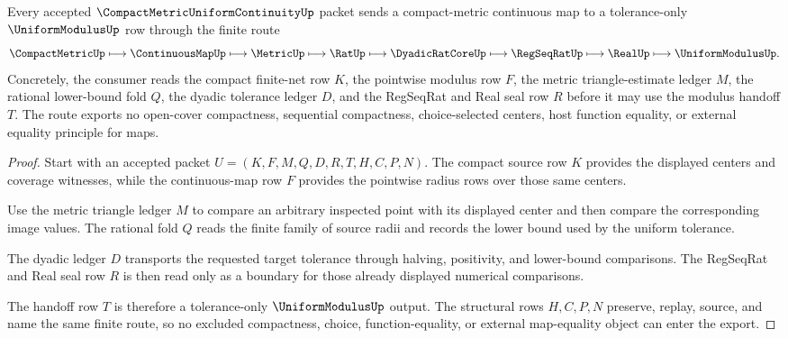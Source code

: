 \begin{theorem}
\label{thm:compact-metric-uniform-continuity-finite-net-modulus-route}
Every accepted $\CompactMetricUniformContinuityUp$ packet sends a compact-metric continuous map to a tolerance-only $\UniformModulusUp$ row through the finite route
$$
\CompactMetricUp
\longmapsto
\ContinuousMapUp
\longmapsto
\MetricUp
\longmapsto
\RatUp
\longmapsto
\DyadicRatCoreUp
\longmapsto
\RegSeqRatUp
\longmapsto
\RealUp
\longmapsto
\UniformModulusUp .
$$
Concretely, the consumer reads the compact finite-net row $K$, the pointwise modulus row $F$, the metric triangle-estimate ledger $M$, the rational lower-bound fold $Q$, the dyadic tolerance ledger $D$, and the RegSeqRat and Real seal row $R$ before it may use the modulus handoff $T$. The route exports no open-cover compactness, sequential compactness, choice-selected centers, host function equality, or external equality principle for maps.
\end{theorem}
\begin{proof}
Start with an accepted packet $U=(K,F,M,Q,D,R,T,H,C,P,N)$. The compact source row $K$ provides the displayed centers and coverage witnesses, while the continuous-map row $F$ provides the pointwise radius rows over those same centers.

Use the metric triangle ledger $M$ to compare an arbitrary inspected point with its displayed center and then compare the corresponding image values. The rational fold $Q$ reads the finite family of source radii and records the lower bound used by the uniform tolerance.

The dyadic ledger $D$ transports the requested target tolerance through halving, positivity, and lower-bound comparisons. The RegSeqRat and Real seal row $R$ is then read only as a boundary for those already displayed numerical comparisons.

The handoff row $T$ is therefore a tolerance-only $\UniformModulusUp$ output. The structural rows $H,C,P,N$ preserve, replay, source, and name the same finite route, so no excluded compactness, choice, function-equality, or external map-equality object can enter the export.
\end{proof}

